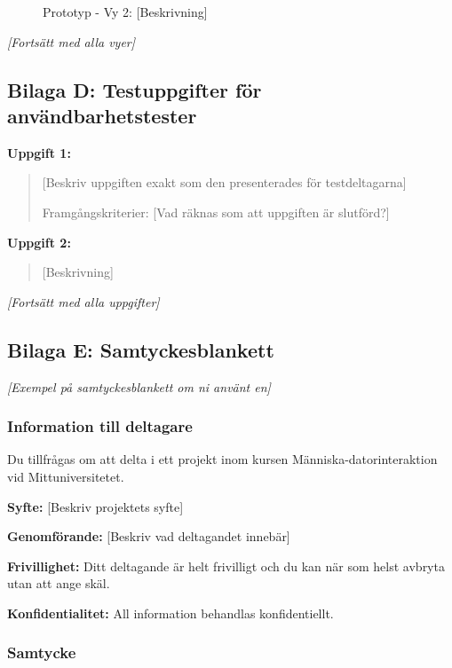 \begin{figure}[ht]
    \centering
    \caption{Prototyp - Vy 2: [Beskrivning]}
\end{figure}

\textit{[Fortsätt med alla vyer]}


\subsection{Bilaga D: Testuppgifter för användbarhetstester}

\textbf{Uppgift 1:}
\begin{quote}
[Beskriv uppgiften exakt som den presenterades för testdeltagarna]

Framgångskriterier: [Vad räknas som att uppgiften är slutförd?]
\end{quote}

\textbf{Uppgift 2:}
\begin{quote}
[Beskrivning]
\end{quote}

\textit{[Fortsätt med alla uppgifter]}


\subsection{Bilaga E: Samtyckesblankett}

\textit{[Exempel på samtyckesblankett om ni använt en]}

\subsubsection{Information till deltagare}

Du tillfrågas om att delta i ett projekt inom kursen Människa-datorinteraktion vid Mittuniversitetet.

\textbf{Syfte:} [Beskriv projektets syfte]

\textbf{Genomförande:} [Beskriv vad deltagandet innebär]

\textbf{Frivillighet:} Ditt deltagande är helt frivilligt och du kan när som helst avbryta utan att ange skäl.

\textbf{Konfidentialitet:} All information behandlas konfidentiellt.

\subsubsection{Samtycke}

